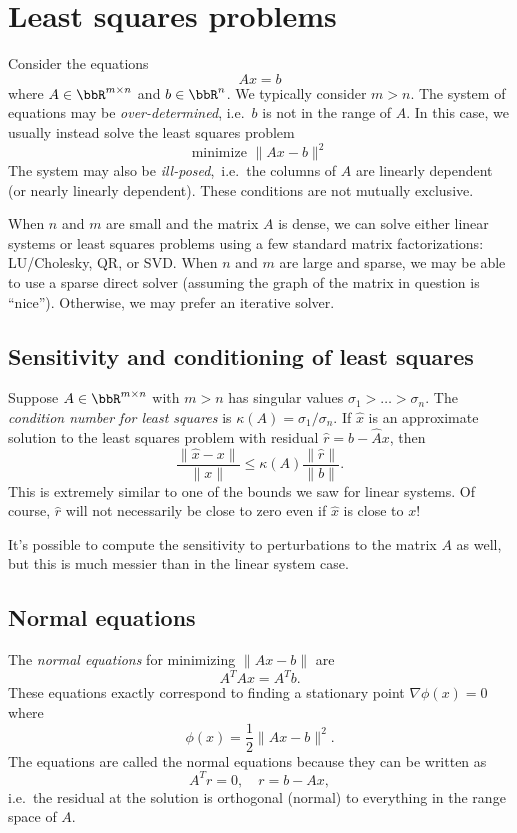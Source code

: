 \documentclass[12pt, leqno]{article}
\begin{document}
\newpage
\section{Least squares problems}

Consider the equations
\[
  Ax = b
\]
where $A \in \bbR^{m \times n}$ and $b \in \bbR^n$.  We typically
consider $m > n$.  The system of equations may be {\em
  over-determined}, i.e.~$b$ is not in the range of $A$.  In this
case, we usually instead solve the least squares problem
\[
  \mbox{minimize } \|Ax-b\|^2
\]
The system may also be {\em ill-posed},~i.e.~the columns of $A$ are
linearly dependent (or nearly linearly dependent).  These conditions
are not mutually exclusive.

When $n$ and $m$ are small and the matrix $A$ is dense, we can solve
either linear systems or least squares problems using a few standard
matrix factorizations: LU/Cholesky, QR, or SVD.  When $n$ and $m$
are large and sparse, we may be able to use a sparse direct solver
(assuming the graph of the matrix in question is ``nice'').
Otherwise, we may prefer an iterative solver.

\subsection{Sensitivity and conditioning of least squares}

Suppose $A \in \bbR^{m \times n}$ with $m > n$ has singular values
$\sigma_1 > \ldots > \sigma_n$.
The {\em condition number for least squares}
is $\kappa(A) = \sigma_1/\sigma_n$.  If $\hat{x}$ is
an approximate solution to the least squares problem with residual
$\hat{r} = b-\hat{A} x$, then
\[
  \frac{\|\hat{x}-x\|}{\|x\|} \leq \kappa(A) \frac{\|\hat{r}\|}{\|b\|}.
\]
This is extremely similar to one of the bounds we saw for linear
systems.  Of course, $\hat{r}$ will not necessarily be close to zero
even if $\hat{x}$ is close to $x$!

It's possible to compute the sensitivity to perturbations to the
matrix $A$ as well, but this is much messier than in the linear system
case.

\subsection{Normal equations}

The {\em normal equations} for minimizing $\|Ax-b\|$ are
\[
  A^T A x = A^T b.
\]
These equations exactly correspond to finding a stationary point
$\nabla \phi(x) = 0$ where
\[
  \phi(x) = \frac{1}{2} \|Ax-b\|^2.
\]
The equations are called the normal equations because they
can be written as
\[
  A^T r = 0, \quad r = b-Ax,
\]
i.e.~the residual at the solution is orthogonal (normal) to everything
in the range space of $A$.
  
\end{document}
